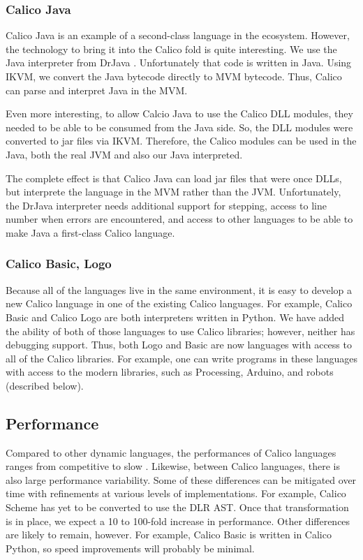 \documentclass[preprint]{sigplanconf}
\begin{document}
\subsubsection{Calico Java}

Calico Java is an example of a second-class language in the
ecosystem. However, the technology to bring it into the Calico fold is
quite interesting. We use the Java interpreter from DrJava
\cite{drjava}. Unfortunately that code is written in Java. Using IKVM,
we convert the Java bytecode directly to MVM bytecode. Thus, Calico can parse
and interpret Java in the MVM.

Even more interesting, to allow Calcio Java to use the Calico DLL modules,
they needed to be able to be consumed from the Java side. So, the DLL
modules were converted to jar files via IKVM. Therefore, the Calico
modules can be used in the Java, both the real JVM and also our Java
interpreted.

The complete effect is that Calico Java can load jar files that were
once DLLs, but interprete the language in the MVM rather than the
JVM. Unfortunately, the DrJava interpreter needs additional support
for stepping, access to line number when errors are encountered, and
access to other languages to be able to make Java a first-class Calico
language.

\subsubsection{Calico Basic, Logo}

Because all of the languages live in the same environment, it is easy
to develop a new Calico language in one of the existing Calico
languages. For example, Calico Basic and Calico Logo are both
interpreters written in Python. We have added the ability of both of
those languages to use Calico libraries; however, neither has
debugging support. Thus, both Logo and Basic are now languages with
access to all of the Calico libraries. For example, one can write
programs in these languages with access to the modern libraries, such
as Processing, Arduino, and robots (described below).

\subsection{Performance}

Compared to other dynamic languages, the performances of Calico
languages ranges from competitive to slow
\cite{python-benchmark}. Likewise, between Calico languages, there is
also large performance variability. Some of these differences can be
mitigated over time with refinements at various levels of
implementations. For example, Calico Scheme has yet to be converted to
use the DLR AST. Once that transformation is in place, we expect a 10
to 100-fold increase in performance. Other differences are likely to
remain, however. For example, Calico Basic is written in Calico
Python, so speed improvements will probably be minimal.
\end{document}
